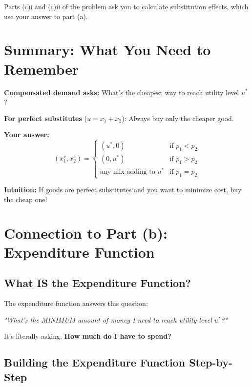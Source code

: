 \documentclass[11pt]{article}
\begin{document}
Parts (c)i and (c)ii of the problem ask you to calculate substitution effects, which use your answer to part (a).

\section{Summary: What You Need to Remember}

\begin{tcolorbox}[colback=blue!5!white,colframe=blue!75!black,title=TL;DR]
\textbf{Compensated demand asks:} What's the cheapest way to reach utility level $u^*$?

\textbf{For perfect substitutes} ($u = x_1 + x_2$): Always buy only the cheaper good.

\textbf{Your answer:}
\begin{equation*}
(x_1^c, x_2^c) =
\begin{cases}
(u^*, 0) & \text{if } p_1 < p_2 \\
(0, u^*) & \text{if } p_1 > p_2 \\
\text{any mix adding to } u^* & \text{if } p_1 = p_2
\end{cases}
\end{equation*}

\textbf{Intuition:} If goods are perfect substitutes and you want to minimize cost, buy the cheap one!
\end{tcolorbox}

\section{Connection to Part (b): Expenditure Function}

\subsection{What IS the Expenditure Function?}

The expenditure function answers this question:

\begin{center}
\textit{"What's the MINIMUM amount of money I need to reach utility level $u^*$?"}
\end{center}

It's literally asking: \textbf{How much do I have to spend?}

\subsection{Building the Expenditure Function Step-by-Step}
\end{document}
